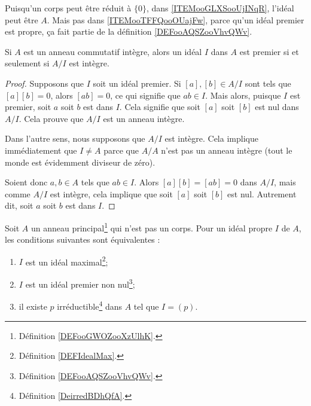 \begin{remark}
	Puisqu'un corps peut être réduit à \( \{0\}\), dans \ref{ITEMooGLXSooUjINqR}, l'idéal peut être \( A\). Mais pas dans \ref{ITEMooTFFQooOUajFw}, parce qu'un idéal premier est propre, ça fait partie de la définition \ref{DEFooAQSZooVhvQWv}.
\end{remark}

\begin{proposition}     \label{PROPooHABIooBZZQMj}
	Si \( A\) est un anneau commutatif intègre, alors un idéal \( I\) dans \( A\) est premier si et seulement si \( A/I\) est intègre.
\end{proposition}

\begin{proof}
	Supposons que \( I\) soit un idéal premier. Si \( [a],[b] \in A/I\)  sont tels que \( [a][b]=0\), alors \( [ab]=0\), ce qui signifie que \( ab\in I\). Mais alors, puisque \( I\) est premier, soit \( a\) soit \( b\) est dans \( I\). Cela signifie que soit \( [a]\) soit \( [b]\) est nul dans \( A/I\). Cela prouve que \( A/I\) est un anneau intègre.

	Dans l'autre sens, nous supposons que \( A/I\) est intègre. Cela implique immédiatement que \( I\neq A\) parce que \( A/A\) n'est pas un anneau intègre (tout le monde est évidemment diviseur de zéro).

	Soient donc \( a,b\in A\) tels que \( ab\in I\). Alors \( [a][b]=[ab]=0\) dans \( A/I\), mais comme \( A/I\) est intègre, cela implique que soit \( [a]\) soit \( [b]\) est nul. Autrement dit, soit \( a\) soit \( b\) est dans \( I\).
\end{proof}

\begin{proposition} \label{PropomqcGe}
	Soit \( A\) un anneau principal\footnote{Définition \ref{DEFooGWOZooXzUlhK}.} qui n'est pas un corps. Pour un idéal propre \( I\) de \( A\), les conditions suivantes sont équivalentes :
	\begin{enumerate}
		\item       \label{ITEMooNOVFooEHtcwE}
		      \( I\) est un idéal maximal\footnote{Définition \ref{DEFIdealMax}.};
		\item       \label{ITEMooMQWVooNocVEU}
		      \( I\) est un idéal premier non nul\footnote{Définition \ref{DEFooAQSZooVhvQWv}.};
		\item       \label{ITEMooJBXGooEISNuW}
		      il existe \( p\) irréductible\footnote{Définition \ref{DeirredBDhQfA}.} dans \( A\) tel que \( I=(p)\).
	\end{enumerate}
\end{proposition}

